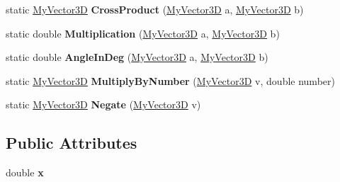 \begin{DoxyCompactItemize}
\item 
\mbox{\label{class_chess_tracking_1_1_utils_1_1_my_vector3_d_a1322bb8ddac862ee9294677b85b1b7f0}} 
static \mbox{\hyperlink{class_chess_tracking_1_1_utils_1_1_my_vector3_d}{My\+Vector3D}} {\bfseries Cross\+Product} (\mbox{\hyperlink{class_chess_tracking_1_1_utils_1_1_my_vector3_d}{My\+Vector3D}} a, \mbox{\hyperlink{class_chess_tracking_1_1_utils_1_1_my_vector3_d}{My\+Vector3D}} b)
\item 
\mbox{\label{class_chess_tracking_1_1_utils_1_1_my_vector3_d_a4fb5a8afae843bf271b86428a221e277}} 
static double {\bfseries Multiplication} (\mbox{\hyperlink{class_chess_tracking_1_1_utils_1_1_my_vector3_d}{My\+Vector3D}} a, \mbox{\hyperlink{class_chess_tracking_1_1_utils_1_1_my_vector3_d}{My\+Vector3D}} b)
\item 
\mbox{\label{class_chess_tracking_1_1_utils_1_1_my_vector3_d_a20cdffc18e5145f30f06ea82318b618e}} 
static double {\bfseries Angle\+In\+Deg} (\mbox{\hyperlink{class_chess_tracking_1_1_utils_1_1_my_vector3_d}{My\+Vector3D}} a, \mbox{\hyperlink{class_chess_tracking_1_1_utils_1_1_my_vector3_d}{My\+Vector3D}} b)
\item 
\mbox{\label{class_chess_tracking_1_1_utils_1_1_my_vector3_d_af8f786d0fc63d27f22e67d729bc8bbed}} 
static \mbox{\hyperlink{class_chess_tracking_1_1_utils_1_1_my_vector3_d}{My\+Vector3D}} {\bfseries Multiply\+By\+Number} (\mbox{\hyperlink{class_chess_tracking_1_1_utils_1_1_my_vector3_d}{My\+Vector3D}} v, double number)
\item 
\mbox{\label{class_chess_tracking_1_1_utils_1_1_my_vector3_d_a6b69c9c5e063568183a0ecb3543fa2ca}} 
static \mbox{\hyperlink{class_chess_tracking_1_1_utils_1_1_my_vector3_d}{My\+Vector3D}} {\bfseries Negate} (\mbox{\hyperlink{class_chess_tracking_1_1_utils_1_1_my_vector3_d}{My\+Vector3D}} v)
\end{DoxyCompactItemize}
\subsection*{Public Attributes}
\begin{DoxyCompactItemize}
\item 
\mbox{\label{class_chess_tracking_1_1_utils_1_1_my_vector3_d_a4269134dac62296e4332510c2218de95}} 
double {\bfseries x}
\end{DoxyCompactItemize}
